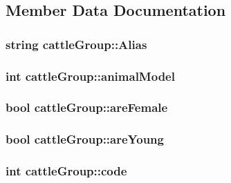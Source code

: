 \subsection{Member Data Documentation}
\hypertarget{classcattle_group_a4c70beb9810cf524d61e750781a1aaf6}{
\subsubsection[{Alias}]{\setlength{\rightskip}{0pt plus 5cm}string {\bf cattleGroup::Alias}}}
\label{classcattle_group_a4c70beb9810cf524d61e750781a1aaf6}
\hypertarget{classcattle_group_a801aff18209e94bd90e17ffa336fc504}{
\subsubsection[{animalModel}]{\setlength{\rightskip}{0pt plus 5cm}int {\bf cattleGroup::animalModel}}}
\label{classcattle_group_a801aff18209e94bd90e17ffa336fc504}
\hypertarget{classcattle_group_a1748b0591b31f5aa3071dd05d8ad06af}{
\subsubsection[{areFemale}]{\setlength{\rightskip}{0pt plus 5cm}bool {\bf cattleGroup::areFemale}}}
\label{classcattle_group_a1748b0591b31f5aa3071dd05d8ad06af}
\hypertarget{classcattle_group_acb05bccffb8970efd702940d4bd27b2a}{
\subsubsection[{areYoung}]{\setlength{\rightskip}{0pt plus 5cm}bool {\bf cattleGroup::areYoung}}}
\label{classcattle_group_acb05bccffb8970efd702940d4bd27b2a}
\hypertarget{classcattle_group_a19e433886e9ece2f2005ade6b28f6b2b}{
\subsubsection[{code}]{\setlength{\rightskip}{0pt plus 5cm}int {\bf cattleGroup::code}}}
